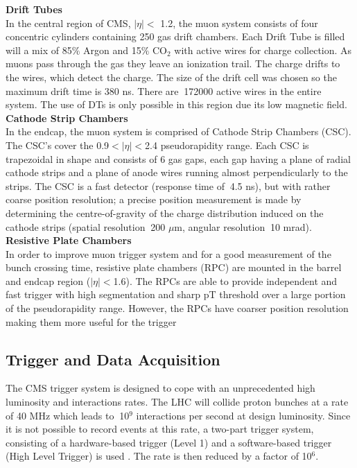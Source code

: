 {\bf Drift Tubes} \\

In the central region of CMS, $|\eta| <$ 1.2, the muon system consists of four concentric
cylinders containing 250 gas drift chambers. Each Drift Tube is filled will a mix of
85$\%$ Argon and 15$\%$ CO$_2$ with active wires for charge collection. As muons pass
through the gas they leave an ionization trail. The charge drifts to the wires, which
detect the charge. The size of the drift cell was chosen so the maximum drift time is
380 ns. There are $~$172000 active wires in the entire system. The use of DTs is only
possible in this region due its low magnetic field.\\


{\bf Cathode Strip Chambers} \\

In the endcap, the muon system is comprised of Cathode Strip Chambers (CSC).
The CSC's cover the 0.9$<|\eta|<$2.4 pseudorapidity range. Each CSC is trapezoidal
in shape and consists of 6 gas gaps, each gap having a plane of radial cathode strips
and a plane of anode wires running almost perpendicularly to the strips. The CSC is
a fast detector (response time of $~$4.5 ns), but with rather coarse position resolution;
a precise position measurement is made by determining the centre-of-gravity of the
charge distribution induced on the cathode strips (spatial resolution $~$200 $\mu$m, angular
resolution $~$10 mrad).\\


{\bf Resistive Plate Chambers} \\

In order to improve muon trigger system and for a good measurement of the bunch
crossing time, resistive plate chambers (RPC) are mounted in the barrel and endcap
region ($|\eta| < $1.6). The RPCs are able to provide independent and fast trigger with
high segmentation and sharp pT threshold over a large portion of the pseudorapidity
range. However, the RPCs have coarser position resolution making them more useful
for the trigger

\subsection{Trigger and Data Acquisition}

The CMS trigger system is designed to cope with an unprecedented high luminosity
and interactions rates. The LHC will collide proton bunches at a rate of 40
MHz which leads to $~$10$^9$ interactions per second at design luminosity. Since it is
not possible to record events at this rate, a two-part trigger system, consisting of a
hardware-based trigger (Level 1) and a software-based trigger (High Level Trigger) is
used \cite{CMSTrigger1,CMSTrigger2}. The rate is then reduced by a factor of 10$^6$.\\


